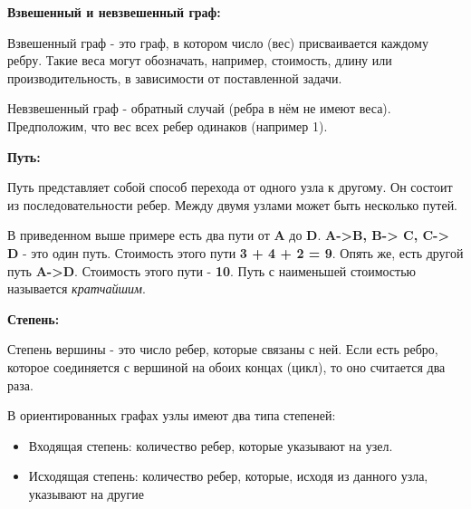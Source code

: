 \vspace{\baselineskip}

\textbf{Взвешенный и невзвешенный граф:}

\vspace{\baselineskip}

Взвешенный граф - это граф, в котором число (вес) присваивается каждому ребру. Такие веса могут обозначать, например, стоимость, длину или производительность, в зависимости от поставленной задачи.

\begin{center}
\end{center}

Невзвешенный граф - обратный случай (ребра в нём не имеют веса). Предположим, что вес всех ребер одинаков (например 1).

\vspace{\baselineskip}

\textbf{Путь:}

\vspace{\baselineskip}

Путь представляет собой способ перехода от одного узла к другому. Он состоит из последовательности ребер. Между двумя узлами может быть несколько путей.

\begin{center}
\end{center}

В приведенном выше примере есть два пути от \textbf{A} до \textbf{D}. \textbf{A->B, B-> C, C-> D} - это один путь. Стоимость этого пути \textbf{3 + 4 + 2 = 9}. Опять же, есть другой путь \textbf{A->D}. Стоимость этого пути - \textbf{10}. Путь с наименьшей стоимостью называется \textit{кратчайшим}.

\vspace{\baselineskip}

\textbf{Степень:}

\vspace{\baselineskip}

Степень вершины - это число ребер, которые связаны с ней. Если есть ребро, которое соединяется с вершиной на обоих концах (цикл), то оно считается два раза.

\vspace{\baselineskip}

В ориентированных графах узлы имеют два типа степеней:
\begin{itemize}
    \item Входящая степень: количество ребер, которые указывают на узел.
    \item Исходящая степень: количество ребер, которые, исходя из данного узла, указывают на другие
\end{itemize}


